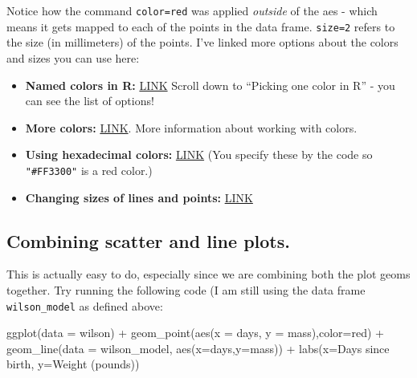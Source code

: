 \documentclass[
]{book}
\newenvironment{Shaded}{\begin{snugshade}}{\end{snugshade}}
\newcommand{\AttributeTok}[1]{\textcolor[rgb]{0.77,0.63,0.00}{#1}}
\newcommand{\FunctionTok}[1]{\textcolor[rgb]{0.00,0.00,0.00}{#1}}
\newcommand{\NormalTok}[1]{#1}
\newcommand{\SpecialCharTok}[1]{\textcolor[rgb]{0.00,0.00,0.00}{#1}}
\newcommand{\StringTok}[1]{\textcolor[rgb]{0.31,0.60,0.02}{#1}}
\providecommand{\tightlist}{%
  \setlength{\itemsep}{0pt}\setlength{\parskip}{0pt}}
\theoremstyle{definition}
\theoremstyle{definition}
\theoremstyle{definition}
\theoremstyle{remark}
\begin{document}
Notice how the command \texttt{color=\textquotesingle{}red\textquotesingle{}} was applied \emph{outside} of the aes - which means it gets mapped to each of the points in the data frame. \texttt{size=2} refers to the size (in millimeters) of the points. I've linked more options about the colors and sizes you can use here:

\begin{itemize}
\tightlist
\item
  \textbf{Named colors in R:} \href{https://www.r-graph-gallery.com/42-colors-names.html}{LINK} Scroll down to ``Picking one color in R'' - you can see the list of options!
\item
  \textbf{More colors:} \href{http://www.cookbook-r.com/Graphs/Colors_(ggplot2)/}{LINK}. More information about working with colors.
\item
  \textbf{Using hexadecimal colors:} \href{http://www.cookbook-r.com/Graphs/Colors_(ggplot2)/\#hexadecimal-color-code-chart}{LINK} (You specify these by the code so \texttt{"\#FF3300"} is a red color.)
\item
  \textbf{Changing sizes of lines and points:} \href{https://ggplot2.tidyverse.org/articles/ggplot2-specs.html}{LINK}
\end{itemize}

\hypertarget{combining-scatter-and-line-plots.}{%
\subsection{Combining scatter and line plots.}\label{combining-scatter-and-line-plots.}}

This is actually easy to do, especially since we are combining both the plot geoms together. Try running the following code (I am still using the data frame \texttt{wilson\_model} as defined above:

\begin{Shaded}
\begin{Highlighting}[]
\FunctionTok{ggplot}\NormalTok{(}\AttributeTok{data =}\NormalTok{ wilson) }\SpecialCharTok{+}
  \FunctionTok{geom\_point}\NormalTok{(}\FunctionTok{aes}\NormalTok{(}\AttributeTok{x =}\NormalTok{ days, }\AttributeTok{y =}\NormalTok{ mass),}\AttributeTok{color=}\StringTok{\textquotesingle{}red\textquotesingle{}}\NormalTok{) }\SpecialCharTok{+}
  \FunctionTok{geom\_line}\NormalTok{(}\AttributeTok{data =}\NormalTok{ wilson\_model, }\FunctionTok{aes}\NormalTok{(}\AttributeTok{x=}\NormalTok{days,}\AttributeTok{y=}\NormalTok{mass)) }\SpecialCharTok{+}
  \FunctionTok{labs}\NormalTok{(}\AttributeTok{x=}\StringTok{\textquotesingle{}Days since birth\textquotesingle{}}\NormalTok{,}
         \AttributeTok{y=}\StringTok{\textquotesingle{}Weight (pounds)\textquotesingle{}}\NormalTok{)}
\end{Highlighting}
\end{Shaded}
\end{document}
